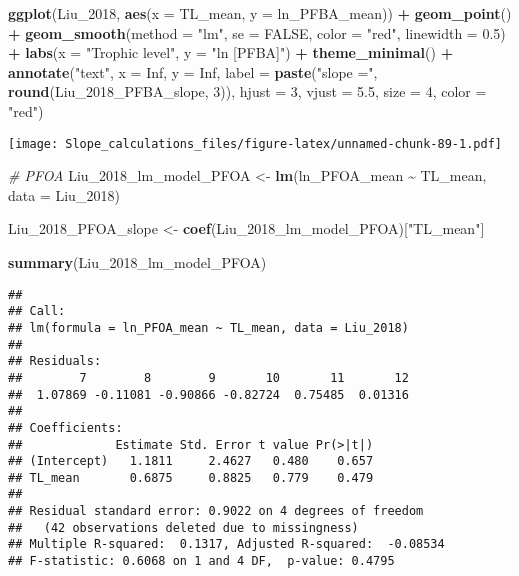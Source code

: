 \documentclass[
]{article}
\newenvironment{Shaded}{\begin{snugshade}}{\end{snugshade}}
\newcommand{\AttributeTok}[1]{\textcolor[rgb]{0.13,0.29,0.53}{#1}}
\newcommand{\CommentTok}[1]{\textcolor[rgb]{0.56,0.35,0.01}{\textit{#1}}}
\newcommand{\ConstantTok}[1]{\textcolor[rgb]{0.56,0.35,0.01}{#1}}
\newcommand{\DecValTok}[1]{\textcolor[rgb]{0.00,0.00,0.81}{#1}}
\newcommand{\FloatTok}[1]{\textcolor[rgb]{0.00,0.00,0.81}{#1}}
\newcommand{\FunctionTok}[1]{\textcolor[rgb]{0.13,0.29,0.53}{\textbf{#1}}}
\newcommand{\NormalTok}[1]{#1}
\newcommand{\OtherTok}[1]{\textcolor[rgb]{0.56,0.35,0.01}{#1}}
\newcommand{\SpecialCharTok}[1]{\textcolor[rgb]{0.81,0.36,0.00}{\textbf{#1}}}
\newcommand{\StringTok}[1]{\textcolor[rgb]{0.31,0.60,0.02}{#1}}
\begin{document}
\begin{Shaded}
\begin{Highlighting}[]
\FunctionTok{ggplot}\NormalTok{(Liu\_2018, }\FunctionTok{aes}\NormalTok{(}\AttributeTok{x =}\NormalTok{ TL\_mean, }\AttributeTok{y =}\NormalTok{ ln\_PFBA\_mean)) }\SpecialCharTok{+}
  \FunctionTok{geom\_point}\NormalTok{() }\SpecialCharTok{+}
  \FunctionTok{geom\_smooth}\NormalTok{(}\AttributeTok{method =} \StringTok{"lm"}\NormalTok{, }\AttributeTok{se =} \ConstantTok{FALSE}\NormalTok{, }\AttributeTok{color =} \StringTok{"red"}\NormalTok{, }\AttributeTok{linewidth =} \FloatTok{0.5}\NormalTok{) }\SpecialCharTok{+}
  \FunctionTok{labs}\NormalTok{(}\AttributeTok{x =} \StringTok{"Trophic level"}\NormalTok{,}
       \AttributeTok{y =} \StringTok{"ln [PFBA]"}\NormalTok{) }\SpecialCharTok{+}
  \FunctionTok{theme\_minimal}\NormalTok{() }\SpecialCharTok{+}
  \FunctionTok{annotate}\NormalTok{(}\StringTok{"text"}\NormalTok{, }\AttributeTok{x =} \ConstantTok{Inf}\NormalTok{, }\AttributeTok{y =} \ConstantTok{Inf}\NormalTok{, }\AttributeTok{label =} \FunctionTok{paste}\NormalTok{(}\StringTok{"slope ="}\NormalTok{, }\FunctionTok{round}\NormalTok{(Liu\_2018\_PFBA\_slope, }\DecValTok{3}\NormalTok{)), }
           \AttributeTok{hjust =} \DecValTok{3}\NormalTok{, }\AttributeTok{vjust =} \FloatTok{5.5}\NormalTok{, }\AttributeTok{size =} \DecValTok{4}\NormalTok{, }\AttributeTok{color =} \StringTok{"red"}\NormalTok{)}
\end{Highlighting}
\end{Shaded}

\texttt{[image: Slope\_calculations\_files/figure-latex/unnamed-chunk-89-1.pdf]}

\begin{Shaded}
\begin{Highlighting}[]
\CommentTok{\# PFOA}
\NormalTok{Liu\_2018\_lm\_model\_PFOA }\OtherTok{\textless{}{-}} \FunctionTok{lm}\NormalTok{(ln\_PFOA\_mean }\SpecialCharTok{\textasciitilde{}}\NormalTok{ TL\_mean,}
                             \AttributeTok{data =}\NormalTok{ Liu\_2018)}

\NormalTok{Liu\_2018\_PFOA\_slope }\OtherTok{\textless{}{-}} \FunctionTok{coef}\NormalTok{(Liu\_2018\_lm\_model\_PFOA)[}\StringTok{"TL\_mean"}\NormalTok{]}


\FunctionTok{summary}\NormalTok{(Liu\_2018\_lm\_model\_PFOA)}
\end{Highlighting}
\end{Shaded}

\begin{verbatim}
## 
## Call:
## lm(formula = ln_PFOA_mean ~ TL_mean, data = Liu_2018)
## 
## Residuals:
##        7        8        9       10       11       12 
##  1.07869 -0.11081 -0.90866 -0.82724  0.75485  0.01316 
## 
## Coefficients:
##             Estimate Std. Error t value Pr(>|t|)
## (Intercept)   1.1811     2.4627   0.480    0.657
## TL_mean       0.6875     0.8825   0.779    0.479
## 
## Residual standard error: 0.9022 on 4 degrees of freedom
##   (42 observations deleted due to missingness)
## Multiple R-squared:  0.1317, Adjusted R-squared:  -0.08534 
## F-statistic: 0.6068 on 1 and 4 DF,  p-value: 0.4795
\end{verbatim}
\end{document}

